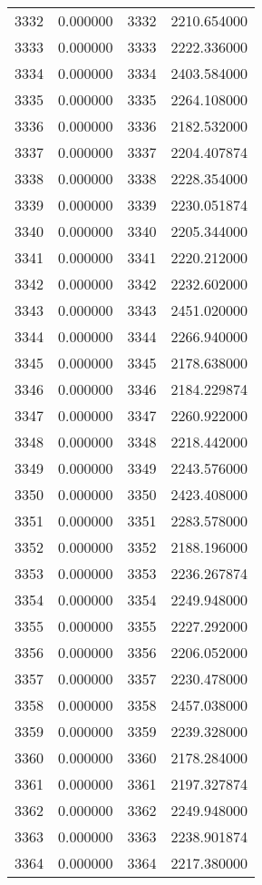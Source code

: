 \documentclass[12pt]{article}
\begin{document}
\begin{longtable}{@{}cccc@{}}
3332 & 0.000000 & 3332 & 2210.654000 \\
3333 & 0.000000 & 3333 & 2222.336000 \\
3334 & 0.000000 & 3334 & 2403.584000 \\
3335 & 0.000000 & 3335 & 2264.108000 \\
3336 & 0.000000 & 3336 & 2182.532000 \\
3337 & 0.000000 & 3337 & 2204.407874 \\
3338 & 0.000000 & 3338 & 2228.354000 \\
3339 & 0.000000 & 3339 & 2230.051874 \\
3340 & 0.000000 & 3340 & 2205.344000 \\
3341 & 0.000000 & 3341 & 2220.212000 \\
3342 & 0.000000 & 3342 & 2232.602000 \\
3343 & 0.000000 & 3343 & 2451.020000 \\
3344 & 0.000000 & 3344 & 2266.940000 \\
3345 & 0.000000 & 3345 & 2178.638000 \\
3346 & 0.000000 & 3346 & 2184.229874 \\
3347 & 0.000000 & 3347 & 2260.922000 \\
3348 & 0.000000 & 3348 & 2218.442000 \\
3349 & 0.000000 & 3349 & 2243.576000 \\
3350 & 0.000000 & 3350 & 2423.408000 \\
3351 & 0.000000 & 3351 & 2283.578000 \\
3352 & 0.000000 & 3352 & 2188.196000 \\
3353 & 0.000000 & 3353 & 2236.267874 \\
3354 & 0.000000 & 3354 & 2249.948000 \\
3355 & 0.000000 & 3355 & 2227.292000 \\
3356 & 0.000000 & 3356 & 2206.052000 \\
3357 & 0.000000 & 3357 & 2230.478000 \\
3358 & 0.000000 & 3358 & 2457.038000 \\
3359 & 0.000000 & 3359 & 2239.328000 \\
3360 & 0.000000 & 3360 & 2178.284000 \\
3361 & 0.000000 & 3361 & 2197.327874 \\
3362 & 0.000000 & 3362 & 2249.948000 \\
3363 & 0.000000 & 3363 & 2238.901874 \\
3364 & 0.000000 & 3364 & 2217.380000 \\

\end{longtable}
\end{document}

